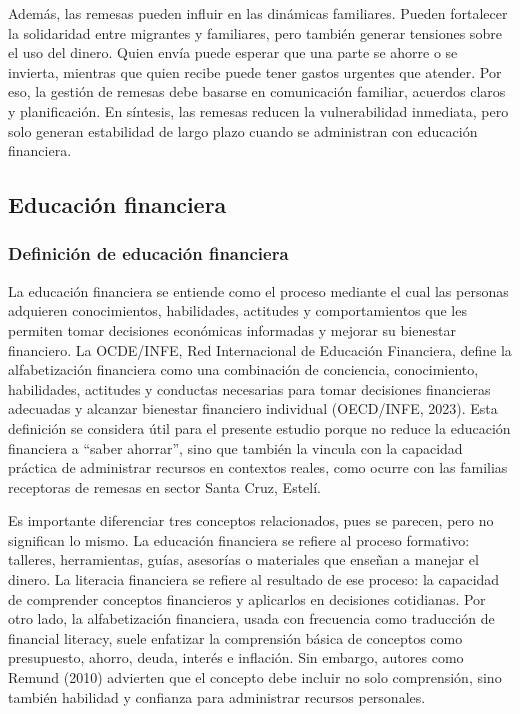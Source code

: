 \documentclass[12pt,letterpaper]{article}
\begin{document}
Además, las remesas pueden influir en las dinámicas familiares. Pueden fortalecer la solidaridad entre migrantes y familiares, pero también generar tensiones sobre el uso del dinero. Quien envía puede esperar que una parte se ahorre o se invierta, mientras que quien recibe puede tener gastos urgentes que atender. Por eso, la gestión de remesas debe basarse en comunicación familiar, acuerdos claros y planificación. En síntesis, las remesas reducen la vulnerabilidad inmediata, pero solo generan estabilidad de largo plazo cuando se administran con educación financiera.

\subsection{\texorpdfstring{\textbf{Educación financiera}}{Educación financiera}}\label{educaciuxf3n-financiera}

\subsubsection{\texorpdfstring{\textbf{Definición de educación financiera}}{Definición de educación financiera}}\label{definiciuxf3n-de-educaciuxf3n-financiera}

La educación financiera se entiende como el proceso mediante el cual las personas adquieren conocimientos, habilidades, actitudes y comportamientos que les permiten tomar decisiones económicas informadas y mejorar su bienestar financiero. La OCDE/INFE, Red Internacional de Educación Financiera, define la alfabetización financiera como una combinación de conciencia, conocimiento, habilidades, actitudes y conductas necesarias para tomar decisiones financieras adecuadas y alcanzar bienestar financiero individual (OECD/INFE, 2023). Esta definición se considera útil para el presente estudio porque no reduce la educación financiera a ``saber ahorrar'', sino que también la vincula con la capacidad práctica de administrar recursos en contextos reales, como ocurre con las familias receptoras de remesas en sector Santa Cruz, Estelí.

Es importante diferenciar tres conceptos relacionados, pues se parecen, pero no significan lo mismo. La educación financiera se refiere al proceso formativo: talleres, herramientas, guías, asesorías o materiales que enseñan a manejar el dinero. La literacia financiera se refiere al resultado de ese proceso: la capacidad de comprender conceptos financieros y aplicarlos en decisiones cotidianas. Por otro lado, la alfabetización financiera, usada con frecuencia como traducción de financial literacy, suele enfatizar la comprensión básica de conceptos como presupuesto, ahorro, deuda, interés e inflación. Sin embargo, autores como Remund (2010) advierten que el concepto debe incluir no solo comprensión, sino también habilidad y confianza para administrar recursos personales.
\end{document}
